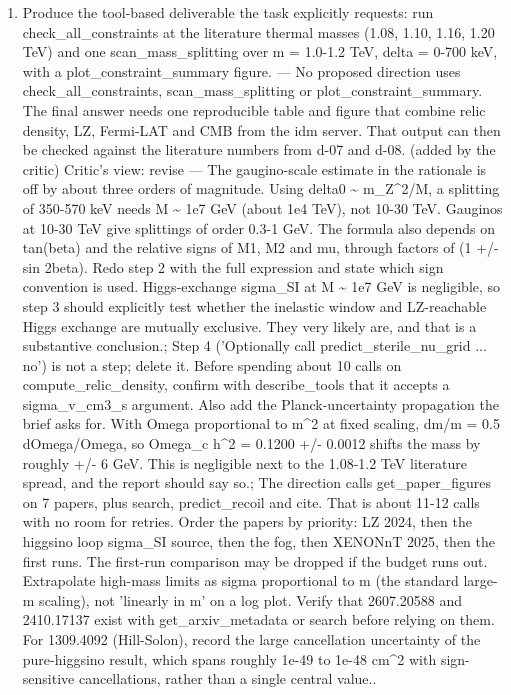 \documentclass[11pt,a4paper]{article}
\begin{document}
\begin{enumerate}
  \item Produce the tool-based deliverable the task explicitly requests: run check\_all\_constraints at the literature thermal masses (1.08, 1.10, 1.16, 1.20 TeV) and one scan\_mass\_splitting over m = 1.0-1.2 TeV, delta = 0-700 keV, with a plot\_constraint\_summary figure. --- No proposed direction uses check\_all\_constraints, scan\_mass\_splitting or plot\_constraint\_summary. The final answer needs one reproducible table and figure that combine relic density, LZ, Fermi-LAT and CMB from the idm server. That output can then be checked against the literature numbers from d-07 and d-08. (added by the critic)
Critic's view: revise --- The gaugino-scale estimate in the rationale is off by about three orders of magnitude. Using delta0 \textasciitilde{} m\_Z\textasciicircum{}2/M, a splitting of 350-570 keV needs M \textasciitilde{} 1e7 GeV (about 1e4 TeV), not 10-30 TeV. Gauginos at 10-30 TeV give splittings of order 0.3-1 GeV. The formula also depends on tan(beta) and the relative signs of M1, M2 and mu, through factors of (1 +/- sin 2beta). Redo step 2 with the full expression and state which sign convention is used. Higgs-exchange sigma\_SI at M \textasciitilde{} 1e7 GeV is negligible, so step 3 should explicitly test whether the inelastic window and LZ-reachable Higgs exchange are mutually exclusive. They very likely are, and that is a substantive conclusion.; Step 4 ('Optionally call predict\_sterile\_nu\_grid ... no') is not a step; delete it. Before spending about 10 calls on compute\_relic\_density, confirm with describe\_tools that it accepts a sigma\_v\_cm3\_s argument. Also add the Planck-uncertainty propagation the brief asks for. With Omega proportional to m\textasciicircum{}2 at fixed scaling, dm/m = 0.5 dOmega/Omega, so Omega\_c h\textasciicircum{}2 = 0.1200 +/- 0.0012 shifts the mass by roughly +/- 6 GeV. This is negligible next to the 1.08-1.2 TeV literature spread, and the report should say so.; The direction calls get\_paper\_figures on 7 papers, plus search, predict\_recoil and cite. That is about 11-12 calls with no room for retries. Order the papers by priority: LZ 2024, then the higgsino loop sigma\_SI source, then the fog, then XENONnT 2025, then the first runs. The first-run comparison may be dropped if the budget runs out. Extrapolate high-mass limits as sigma proportional to m (the standard large-m scaling), not 'linearly in m' on a log plot. Verify that 2607.20588 and 2410.17137 exist with get\_arxiv\_metadata or search before relying on them. For 1309.4092 (Hill-Solon), record the large cancellation uncertainty of the pure-higgsino result, which spans roughly 1e-49 to 1e-48 cm\textasciicircum{}2 with sign-sensitive cancellations, rather than a single central value..

\end{enumerate}
\end{document}
